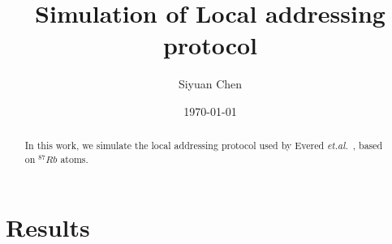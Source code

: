 \documentclass[aps,%
onecolumn,%
floatfix,%
pra,%
amsfonts,%
longbibliography,%
groupedaddress,%
superscriptaddress]{revtex4-2}%
\newcommand{\1}{\mathbbm{1}}
\begin{document}
\title{Simulation of Local addressing protocol}
\author{Siyuan Chen}
%


\begin{abstract}
\noindent 
In this work, we simulate the local addressing protocol used by Evered \emph{et.al.}~\cite{Evered_2023}, based on $^{87}Rb$ atoms.
\end{abstract}
\date{\today}
\maketitle

\section{Results}
\end{document}
